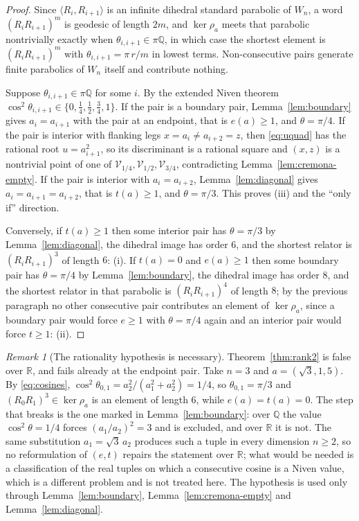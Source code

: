 \documentclass[11pt,a4paper]{article}
\newcommand{\R}{\mathbb{R}}
\newcommand{\Q}{\mathbb{Q}}
\theoremstyle{definition}
\theoremstyle{remark}
\newtheorem{remark}[theorem]{Remark}
\theoremstyle{plain}
\begin{document}
\begin{proof}
Since $\langle R_i,R_{i+1}\rangle$ is an infinite dihedral standard parabolic of $W_n$, a word
$(R_iR_{i+1})^m$ is geodesic of length $2m$, and $\ker\rho_a$ meets that parabolic nontrivially
exactly when $\theta_{i,i+1}\in\pi\Q$, in which case the shortest element is
$(R_iR_{i+1})^{m}$ with $\theta_{i,i+1}=\pi\,r/m$ in lowest terms. Non-consecutive pairs
generate finite parabolics of $W_n$ itself and contribute nothing.

Suppose $\theta_{i,i+1}\in\pi\Q$ for some $i$. By the extended Niven theorem
$\cos^2\theta_{i,i+1}\in\{0,\tfrac14,\tfrac12,\tfrac34,1\}$. If the pair is a boundary pair,
Lemma~\ref{lem:boundary} gives $a_i=a_{i+1}$ with the pair at an endpoint, that is $e(a)\ge1$,
and $\theta=\pi/4$. If the pair is interior with flanking legs $x=a_i\ne a_{i+2}=z$, then
\eqref{eq:uquad} has the rational root $u=a_{i+1}^2$, so its discriminant is a rational square
and $(x,z)$ is a nontrivial point of one of $\mathcal{V}_{1/4},\mathcal{V}_{1/2},
\mathcal{V}_{3/4}$, contradicting Lemma~\ref{lem:cremona-empty}. If the pair is interior with
$a_i=a_{i+2}$, Lemma~\ref{lem:diagonal} gives $a_i=a_{i+1}=a_{i+2}$, that is $t(a)\ge1$, and
$\theta=\pi/3$. This proves (iii) and the ``only if'' direction.

Conversely, if $t(a)\ge1$ then some interior pair has $\theta=\pi/3$ by
Lemma~\ref{lem:diagonal}, the dihedral image has order $6$, and the shortest relator is
$(R_iR_{i+1})^3$ of length $6$: (i). If $t(a)=0$ and $e(a)\ge1$ then some boundary pair has
$\theta=\pi/4$ by Lemma~\ref{lem:boundary}, the dihedral image has order $8$, and the shortest
relator in that parabolic is $(R_iR_{i+1})^4$ of length $8$; by the previous paragraph no other
consecutive pair contributes an element of $\ker\rho_a$, since a boundary pair would force
$e\ge1$ with $\theta=\pi/4$ again and an interior pair would force $t\ge1$: (ii).
\end{proof}

\begin{remark}[The rationality hypothesis is necessary]\label{rem:rank2-rational}
Theorem~\ref{thm:rank2} is false over $\R$, and fails already at the endpoint pair. Take
$n=3$ and $a=(\sqrt3,1,5)$. By \eqref{eq:cosines},
$\cos^2\theta_{0,1}=a_2^2/(a_1^2+a_2^2)=1/4$, so $\theta_{0,1}=\pi/3$ and
$(R_0R_1)^3\in\ker\rho_a$ is an element of length $6$, while $e(a)=t(a)=0$. The step that
breaks is the one marked in Lemma~\ref{lem:boundary}: over $\Q$ the value $\cos^2\theta=1/4$
forces $(a_1/a_2)^2=3$ and is excluded, and over $\R$ it is not. The same substitution
$a_1=\sqrt3\,a_2$ produces such a tuple in every dimension $n\ge2$, so no reformulation of
$(e,t)$ repairs the statement over $\R$; what would be needed is a classification of the real
tuples on which a consecutive cosine is a Niven value, which is a different problem and is not
treated here. The hypothesis is used only through Lemma~\ref{lem:boundary},
Lemma~\ref{lem:cremona-empty} and Lemma~\ref{lem:diagonal}.
\end{remark}
\end{document}
